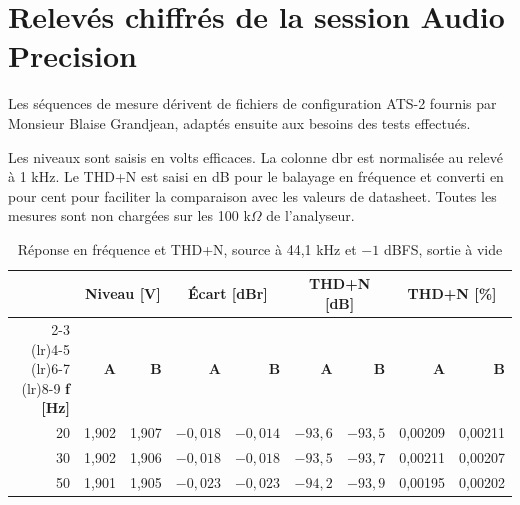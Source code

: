 \section{Relevés chiffrés de la session Audio Precision}
\label{ann:mesures_ap}

Les séquences de mesure dérivent de fichiers de configuration ATS-2 fournis par Monsieur Blaise Grandjean, adaptés ensuite aux besoins des tests effectués.

Les niveaux sont saisis en volts efficaces. La colonne \gls{dbr} est normalisée au relevé à 1 kHz. Le THD+N est saisi en dB pour le balayage en fréquence et converti en pour cent pour faciliter la comparaison avec les valeurs de datasheet. Toutes les mesures sont non chargées sur les 100 k$\Omega$ de l'analyseur.

\begin{table}[H]
  \centering
  \caption{Réponse en fréquence et THD+N, source à 44,1 kHz et $-1$ dBFS, sortie à vide}
  \label{tab:ann_ap_reponse}
  \setlength{\tabcolsep}{4pt}
  \begin{tabular}{@{}r rr rr rr rr@{}}
    \toprule
                    & \multicolumn{2}{c}{\textbf{Niveau [V]}} & \multicolumn{2}{c}{\textbf{Écart [dBr]}} & \multicolumn{2}{c}{\textbf{THD+N [dB]}} & \multicolumn{2}{c}{\textbf{THD+N [\%]}}                                                     \\
    \cmidrule(lr){2-3} \cmidrule(lr){4-5} \cmidrule(lr){6-7} \cmidrule(lr){8-9}
    \textbf{f [Hz]} & \textbf{A}                              & \textbf{B}                               & \textbf{A}                              & \textbf{B}                              & \textbf{A} & \textbf{B} & \textbf{A} & \textbf{B} \\
    \midrule
    20              & 1,902                                   & 1,907                                    & $-0,018$                                & $-0,014$                                & $-93,6$    & $-93,5$    & 0,00209    & 0,00211    \\
    30              & 1,902                                   & 1,906                                    & $-0,018$                                & $-0,018$                                & $-93,5$    & $-93,7$    & 0,00211    & 0,00207    \\
    50              & 1,901                                   & 1,905                                    & $-0,023$                                & $-0,023$                                & $-94,2$    & $-93,9$    & 0,00195    & 0,00202    \\

\end{tabular}
\end{table}
